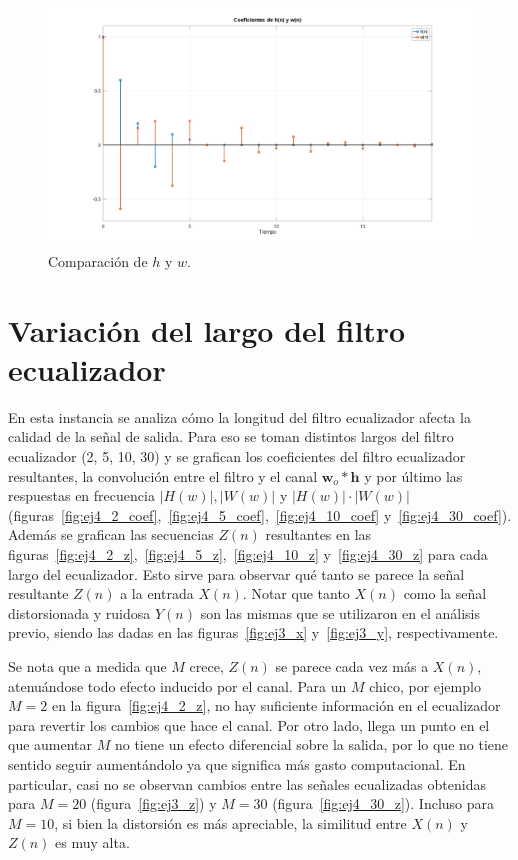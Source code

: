 \begin{figure}[!hbp]
	\centering
	\includegraphics[width=1\linewidth,trim=4cm 0 4cm 0,clip]{img/ej3_coef.pdf}
	\caption{Comparación de $h$ y $w$.}
	\label{fig:ej3_coef}
\end{figure}

\clearpage

\section{Variación del largo del filtro ecualizador}

En esta instancia se analiza cómo la longitud del filtro ecualizador afecta la calidad de la señal de salida. Para eso se toman distintos largos del filtro ecualizador (2, 5, 10, 30) y se grafican los coeficientes del filtro ecualizador resultantes, la convolución entre el filtro y el canal $\mathbf{w}_o * \mathbf{h}$ y por último las respuestas en frecuencia $|H(w)|, |W(w)|$ y $|H(w)| \cdot |W(w)|$ (figuras~\ref{fig:ej4_2_coef},~\ref{fig:ej4_5_coef},~\ref{fig:ej4_10_coef} y~\ref{fig:ej4_30_coef}). Además se grafican las secuencias $Z(n)$ resultantes en las figuras~\ref{fig:ej4_2_z},~\ref{fig:ej4_5_z},~\ref{fig:ej4_10_z} y~\ref{fig:ej4_30_z} para cada largo del ecualizador. Esto sirve para observar qué tanto se parece la señal resultante $Z(n)$ a la entrada $X(n)$. Notar que tanto $X(n)$ como la señal distorsionada y ruidosa $Y(n)$ son las mismas que se utilizaron en el análisis previo, siendo las dadas en las figuras~\ref{fig:ej3_x} y~\ref{fig:ej3_y}, respectivamente.

Se nota que a medida que $M$ crece, $Z(n)$ se parece cada vez más a $X(n)$, atenuándose todo efecto inducido por el canal. Para un $M$ chico, por ejemplo $M = 2$ en la figura~\ref{fig:ej4_2_z}, no hay suficiente información en el ecualizador para revertir los cambios que hace el canal. Por otro lado, llega un punto en el que aumentar $M$ no tiene un efecto diferencial sobre la salida, por lo que no tiene sentido seguir aumentándolo ya que significa más gasto computacional. En particular, casi no se observan cambios entre las señales ecualizadas obtenidas para $M = 20$ (figura~\ref{fig:ej3_z}) y $M = 30$ (figura~\ref{fig:ej4_30_z}). Incluso para $M = 10$, si bien la distorsión es más apreciable, la similitud entre $X(n)$ y $Z(n)$ es muy alta.

